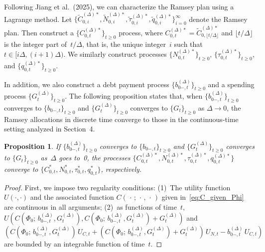 \documentclass[12pt]{article}
\newtheorem{proposition}{Proposition}
\begin{document}
{{{Following Jiang et al.\ (2025), we can characterize the Ramsey plan using a Lagrange method. Let $\{\tilde{C}_{0,i}^{(\Delta)*}, \tilde{N}_{0,i}^{(\Delta)*}, \tilde{\tau}_{0,i}^{(\Delta)*}, \tilde{q}_{0,i}^{(\Delta)*}\}_{i=0}^\infty$ denote the Ramsey plan. Then construct a $\{C_{0,t}^{(\Delta)*}\}_{t \ge 0}$ process, where $C_{0,t}^{(\Delta)*} = \tilde{C}_{0,\lfloor t/\Delta\rfloor}^{(\Delta)*}$ and $\lfloor t/\Delta \rfloor$ is the integer part of~$t/\Delta$, that is, the unique integer~$i$ such that $t \in [i\Delta, (i+1)\Delta)$. {We similarly construct processes $\{N_{0,t}^{(\Delta)*}\}_{t \ge 0}$, $\{\tau_{0,t}^{(\Delta)*}\}_{t \ge 0}$, and $\{q_{0,t}^{(\Delta)*}\}_{t \ge 0}$.}

In addition, we also construct a debt payment process $\{b_{0-,t}^{(\Delta)}\}_{t \ge 0}$ and a spending process $\{G_t^{(\Delta)}\}_{t \ge 0}$. The following proposition states that, when $\{b_{0-,t}^{(\Delta)}\}_{t \ge 0}$ converges to $\{b_{0-,t}\}_{t \ge 0}$ and $\{G_t^{(\Delta)}\}_{t \ge 0}$ converges to $\{G_t\}_{t \ge 0}$ as $\Delta \to 0$, the Ramsey allocations in discrete time converge to those in the continuous-time setting analyzed in Section~4.

\begin{proposition}\label{prop:convergence}
	If $\{b_{0-,t}^{(\Delta)}\}_{t \ge 0}$ converges to $\{b_{0-,t}\}_{t \ge 0}$ and $\{G_t^{(\Delta)}\}_{t \ge 0}$ converges to $\{G_t\}_{t \ge 0}$ as~$\Delta$ goes to~0, the processes $\{C_{0,t}^{(\Delta)*}, N_{0,t}^{(\Delta)*}, \tau_{0,t}^{(\Delta)*}, q_{0,t}^{(\Delta)*}\}$ converge to $\{C_{0,t}^*, N_{0,t}^*, \tau_{0,t}^*, q_{0,t}^*\}$, respectively.
\end{proposition}

\begin{proof}
First, we impose two regularity conditions: (1)~The utility function $U(\cdot,\cdot)$ and the associated function $C(\,\cdot\,;\, \cdot\,,\, \cdot\,)$ given in~\eqref{eq:C_given_Phi} are continuous in all arguments; (2)~as functions of time~$t$, $U(C(\Phi_0;\, b_{0-,t}^{(\Delta)}, G_t^{(\Delta)}), C(\Phi_0;\, b_{0-,t}^{(\Delta)}, G_t^{(\Delta)})+G_t^{(\Delta)})$ and $(C(\Phi_0;\, b_{0-,t}^{(\Delta)}, G_t^{(\Delta)})\, U_{C,t} + (C(\Phi_0;\, b_{0-,t}^{(\Delta)}, G_t^{(\Delta)})+G_t^{(\Delta)})\, U_{N,t} - b_{0-,t}^{(\Delta)}\, U_{C,t})$ are bounded by an integrable function of time~$t$.


\end{proof}}}}
\end{document}
